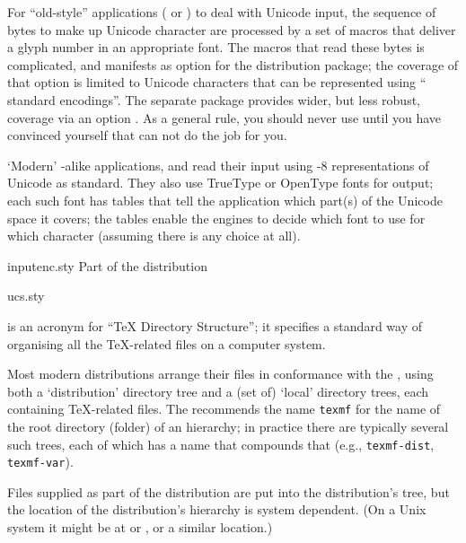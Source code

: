 For ``old-style'' applications (\tex{} or \pdftex{}) to deal with
Unicode input, the sequence of bytes to make up Unicode character are
processed by a set of macros that deliver a glyph number in an
appropriate font.  The macros that read these bytes is complicated,
and manifests as  option for the \latex{} distribution
 package; the coverage of that option is limited to
Unicode characters that can be represented using ``\latex{} standard
encodings''.  The separate package  provides wider, but
less robust, coverage via an  option
.  As a general rule, you should never use
 until you have convinced yourself that
 can not do the job for you.

`Modern' \tex{}-alike applications,  and
 read their input using -8
representations of Unicode as standard.  They also use TrueType or
OpenType fonts for output; each such font has tables that tell the
application which part(s) of the Unicode space it covers; the tables
enable the engines to decide which font to use for which character
(assuming there is any choice at all).
\begin{ctanrefs}
\item[inputenc.sty]Part of the  distribution
\item[ucs.sty]
\end{ctanrefs}


 is an acronym for ``\TeX{} Directory Structure''; it
specifies a standard way of organising all the \TeX{}-related files on
a computer system.

Most modern distributions arrange their \tex{} files in conformance
with the , using both a `distribution' directory tree and a
(set of) `local' directory trees, each containing \TeX{}-related
files.  The  recommends the name \texttt{texmf} for the name
of the root directory (folder) of an hierarchy; in practice there are
typically several such trees, each of which has a name that compounds
that (e.g., \texttt{texmf-dist}, \texttt{texmf-var}).

Files supplied as part of the distribution are put into the
distribution's tree, but the location of the distribution's hierarchy is
system dependent.  (On a Unix system it might be at
 or , or a similar location.)


